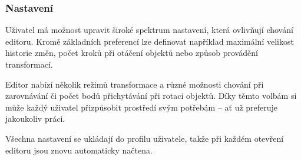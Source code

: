 \subsubsection{Nastavení}

Uživatel má možnost upravit široké spektrum nastavení, která ovlivňují chování editoru. 
Kromě základních preferencí lze definovat například maximální velikost historie změn, počet kroků při otáčení objektů nebo způsob provádění transformací.

Editor nabízí několik režimů transformace a různé možnosti chování při zarovnávání či počet bodů přichytávání při rotaci objektů. 
Díky těmto volbám si může každý uživatel přizpůsobit prostředí svým potřebám -- ať už preferuje jakoukoliv práci.

Všechna nastavení se ukládají do profilu uživatele, takže při každém otevření editoru jsou znovu automaticky načtena.








